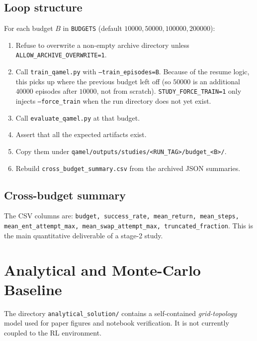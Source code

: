 \documentclass[11pt]{article}
\newcommand{\code}[1]{\texttt{#1}}
\newcommand{\file}[1]{\texttt{\small #1}}
\begin{document}
\subsection{Loop structure}
For each budget $B$ in \code{BUDGETS} (default $10000, 50000, 100000, 200000$):
\begin{enumerate}
  \item Refuse to overwrite a non-empty archive directory unless \code{ALLOW\_ARCHIVE\_OVERWRITE=1}.
  \item Call \file{train\_qamel.py} with \code{--train\_episodes=B}. Because of the resume logic, this picks up where the previous budget left off (so $50000$ is an additional $40000$ episodes after $10000$, not from scratch). \code{STUDY\_FORCE\_TRAIN=1} only injects \code{--force\_train} when the run directory does not yet exist.
  \item Call \file{evaluate\_qamel.py} at that budget.
  \item Assert that all the expected artifacts exist.
  \item Copy them under \file{qamel/outputs/studies/\textless RUN\_TAG\textgreater/budget\_\textless B\textgreater/}.
  \item Rebuild \file{cross\_budget\_summary.csv} from the archived JSON summaries.
\end{enumerate}

\subsection{Cross-budget summary}
The CSV columns are: \code{budget, success\_rate, mean\_return, mean\_steps, mean\_ent\_attempt\_max, mean\_swap\_attempt\_max, truncated\_fraction}. This is the main quantitative deliverable of a stage-2 study.

\section{Analytical and Monte-Carlo Baseline}
\label{sec:analytic}

The directory \file{analytical\_solution/} contains a self-contained \emph{grid-topology} model used for paper figures and notebook verification. It is not currently coupled to the RL environment.
\end{document}
